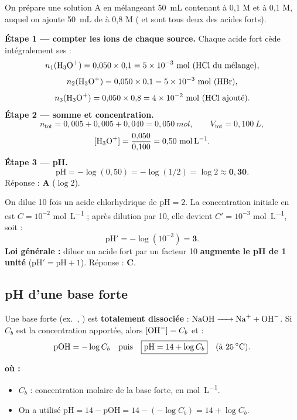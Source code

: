 \documentclass[11pt,a4paper]{article}
\newenvironment{ou}{%
  \par\smallskip\noindent\textbf{où :}\nopagebreak
  \begin{itemize}[leftmargin=1.8em,topsep=2pt,itemsep=1.5pt,parsep=0pt]}%
  {\end{itemize}}
\begin{document}
\begin{exemple}
On prépare une solution A en mélangeant \SI{50}{mL} contenant  à 0,1 M et  à 0,1 M, auquel on
ajoute \SI{50}{mL} de  à 0,8 M ( et  sont tous deux des acides forts).

\smallskip
\textbf{Étape 1 — compter les ions  de chaque source.} Chaque acide fort cède intégralement ses  :
\[ n_1(\ce{H3O+}) = 0{,}050\times0{,}1 = 5\times10^{-3}\ \si{mol}\ (\ce{HCl}\ \text{du mélange}), \]
\[ n_2(\ce{H3O+}) = 0{,}050\times0{,}1 = 5\times10^{-3}\ \si{mol}\ (\ce{HBr}), \]
\[ n_3(\ce{H3O+}) = 0{,}050\times0{,}8 = 4\times10^{-2}\ \si{mol}\ (\ce{HCl}\ \text{ajouté}). \]
\textbf{Étape 2 — somme et concentration.}
\[ n_{\text{tot}} = 0{,}005 + 0{,}005 + 0{,}040 = 0{,}050\ \si{mol},\qquad V_{\text{tot}} = 0{,}100\ \si{L}, \]
\[ [\ce{H3O+}] = \frac{0{,}050}{0{,}100} = 0{,}50\ \si{mol.L^{-1}}. \]
\textbf{Étape 3 — pH.}
\[ \mathrm{pH} = -\log(0{,}50) = -\log(1/2) = \log 2 \approx \mathbf{0{,}30}. \]
Réponse : \textbf{A} ($\log 2$).
\end{exemple}

\begin{exemple}
On dilue 10 fois un acide chlorhydrique de $\mathrm{pH}=2$. La concentration initiale en  est
$C = 10^{-2}$ \si{mol.L^{-1}} ; après dilution par 10, elle devient $C' = 10^{-3}$ \si{mol.L^{-1}}, soit :
\[ \mathrm{pH}' = -\log(10^{-3}) = \mathbf{3}. \]
\textbf{Loi générale :} diluer un acide fort par un facteur 10 \textbf{augmente le pH de 1 unité}
($\mathrm{pH}' = \mathrm{pH} + 1$). Réponse : \textbf{C}.
\end{exemple}

\subsection{pH d'une base forte}

\begin{formule}
Une base forte (ex.\ , ) est \textbf{totalement dissociée} :
$\ce{NaOH -> Na+ + OH-}$. Si $C_b$ est la concentration apportée, alors $[\ce{OH-}] = C_b$ et :
\[ \mathrm{pOH} = -\log C_b \quad\text{puis}\quad \boxed{\mathrm{pH} = 14 + \log C_b}\quad (\text{à \SI{25}{\celsius}}). \]
\end{formule}

\begin{ou}
\item $C_b$ : concentration molaire de la base forte, en \si{mol.L^{-1}}.
\item On a utilisé $\mathrm{pH} = 14 - \mathrm{pOH} = 14 - (-\log C_b) = 14 + \log C_b$.
\end{ou}
\end{document}
